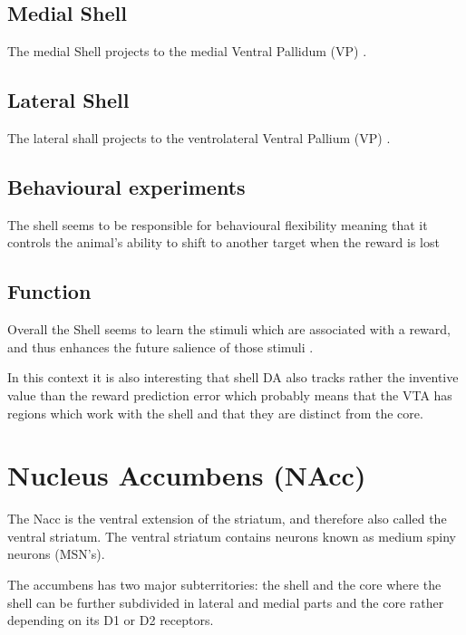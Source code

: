 \documentclass[12pt,a4paper]{article}
\begin{document}
\subsection{Medial Shell}

The medial Shell projects to the medial Ventral Pallidum (VP) \citep{Ikemoto2007}.

\subsection{Lateral Shell}

The lateral shall projects to the ventrolateral Ventral Pallium (VP) \citep{Ikemoto2007}.


\subsection{Behavioural experiments}

The shell seems to be responsible for behavioural flexibility meaning that it controls the animal's ability to shift to another target when the reward is lost \citep{Aquili2014}

\subsection{Function}

Overall the Shell seems to learn the stimuli which are associated with a reward, and thus enhances the future salience of those stimuli \citep{Cassidy2017}.

In this context it is also interesting that shell DA also tracks rather the inventive value than the reward prediction error \citep{Sackett2017} which probably means that the VTA has regions which work with the shell and that they are distinct from the core.




\section{Nucleus Accumbens (NAcc)}

The Nacc is the ventral extension of the striatum, and therefore also called the ventral striatum.  The ventral striatum contains neurons known as medium spiny neurons (MSN's).

The accumbens has two major subterritories: the shell and the core 
\citep{heimer91} where the shell can be further subdivided \citep{Usuda1998} in lateral and medial parts and the core rather depending on its D1 or D2 receptors.
\end{document}

